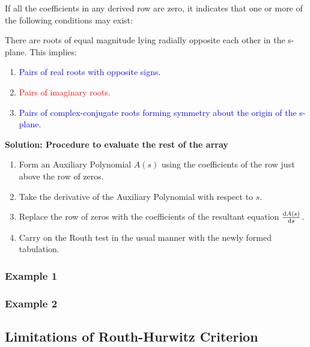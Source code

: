 \documentclass[
  14pt,
  a4paper,
  oneside,
  open=any,
  a4paper,
  14pt]{report}
\begin{document}
If all the coefficients in any derived row are zero, it indicates that
one or more of the following conditions may exist:

There are roots of equal magnitude lying radially opposite each other in
the s-plane. This implies:

\begin{enumerate}
\def\labelenumi{\arabic{enumi}.}
\item
  \textcolor{blue}{Pairs of real roots with opposite signs.}
\item
  \textcolor{red}{Pairs of imaginary roots.}
\item
  \textcolor{blue}{Pairs of complex-conjugate roots forming symmetry
  about the origin of the s-plane.}
\end{enumerate}

\textbf{Solution: Procedure to evaluate the rest of the array}

\begin{enumerate}
\def\labelenumi{\arabic{enumi}.}
\item
  Form an Auxiliary Polynomial \(A(s)\) using the coefficients of the
  row just above the row of zeros.
\item
  Take the derivative of the Auxiliary Polynomial with respect to \(s\).
\item
  Replace the row of zeros with the coefficients of the resultant
  equation \(\odv{A(s)}{s}\).
\item
  Carry on the Routh test in the usual manner with the newly formed
  tabulation.
\end{enumerate}

\subsubsection{Example 1}\label{example-1-3}

\subsubsection{Example 2}\label{example-2-2}

\subsection{Limitations of Routh-Hurwitz
Criterion}\label{limitations-of-routh-hurwitz-criterion}
\end{document}
